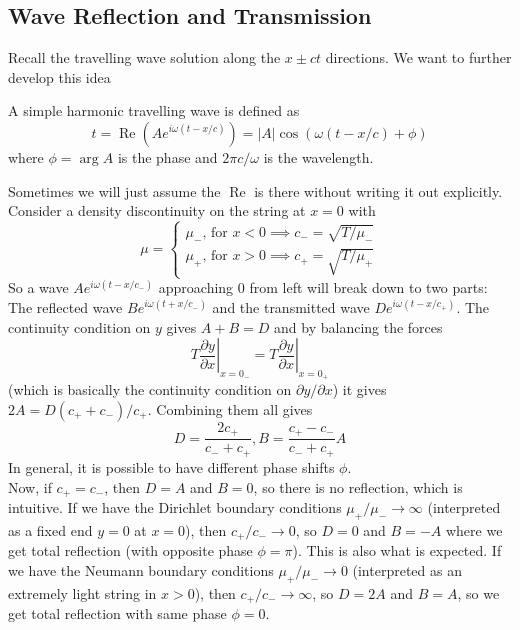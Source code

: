 \subsection{Wave Reflection and Transmission}
Recall the travelling wave solution along the $x\pm ct$ directions.
We want to further develop this idea
\begin{definition}
    A simple harmonic travelling wave is defined as
    $$t=\operatorname{Re}(Ae^{i\omega (t-x/c)})=|A|\cos(\omega(t-x/c)+\phi)$$
    where $\phi=\arg A$ is the phase and $2\pi c/\omega$ is the wavelength.
\end{definition}
Sometimes we will just assume the $\operatorname{Re}$ is there without writing it out explicitly.\\
Consider a density discontinuity on the string at $x=0$ with
$$\mu=\begin{cases}
    \mu_-\text{, for $x<0$}\implies c_-=\sqrt{T/\mu_-}\\
    \mu_+\text{, for $x>0$}\implies c_+=\sqrt{T/\mu_+}
\end{cases}$$
So a wave $Ae^{i\omega (t-x/c_-)}$ approaching $0$ from left will break down to two parts:
The reflected wave $Be^{i\omega (t+x/c_-)}$ and the transmitted wave $De^{i\omega (t-x/c_+)}$.
The continuity condition on $y$ gives $A+B=D$ and by balancing the forces
$$T\left.\frac{\partial y}{\partial x}\right|_{x=0_-}=T\left.\frac{\partial y}{\partial x}\right|_{x=0_+}$$
(which is basically the continuity condition on $\partial y/\partial x$) it gives $2A=D(c_++c_-)/c_+$.
Combining them all gives
$$D=\frac{2c_+}{c_-+c_+},B=\frac{c_+-c_-}{c_-+c_+}A$$
In general, it is possible to have different phase shifts $\phi$.\\
Now, if $c_+=c_-$, then $D=A$ and $B=0$, so there is no reflection, which is intuitive.
If we have the Dirichlet boundary conditions $\mu_+/\mu_-\to\infty$ (interpreted as a fixed end $y=0$ at $x=0$), then $c_+/c_-\to 0$, so $D=0$ and $B=-A$ where we get total reflection (with opposite phase $\phi=\pi$).
This is also what is expected.
If we have the Neumann boundary conditions $\mu_+/\mu_-\to 0$ (interpreted as an extremely light string in $x>0$), then $c_+/c_-\to\infty$, so $D=2A$ and $B=A$, so we get total reflection with same phase $\phi=0$.
